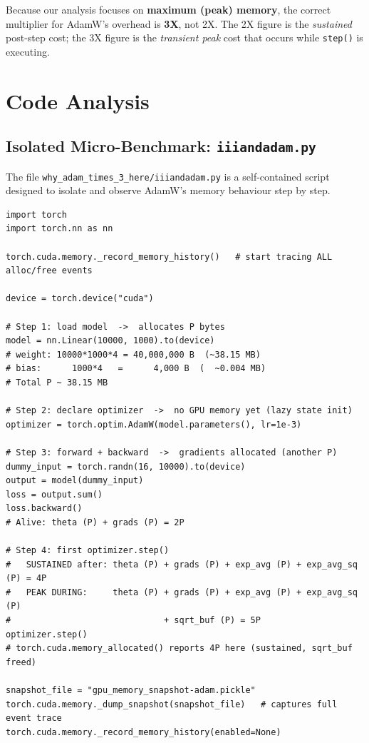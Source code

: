 \documentclass[11pt,a4paper]{article}
\begin{document}
\begin{insight}
Because our analysis focuses on \textbf{maximum (peak) memory}, the
correct multiplier for AdamW's overhead is \textbf{3X}, not 2X.  The
2X figure is the \emph{sustained} post-step cost; the 3X figure is the
\emph{transient peak} cost that occurs while \texttt{step()} is executing.
\end{insight}

\section{Code Analysis}
\label{sec:code}

\subsection{Isolated Micro-Benchmark: \texttt{iiiandadam.py}}
\label{sec:iiiandadam}

The file \texttt{why\_adam\_times\_3\_here/iiiandadam.py} is a self-contained
script designed to isolate and observe AdamW's memory behaviour step by
step.

\begin{lstlisting}[caption={\texttt{why\_adam\_times\_3\_here/iiiandadam.py} (full script).}]
import torch
import torch.nn as nn

torch.cuda.memory._record_memory_history()   # start tracing ALL alloc/free events

device = torch.device("cuda")

# Step 1: load model  ->  allocates P bytes
model = nn.Linear(10000, 1000).to(device)
# weight: 10000*1000*4 = 40,000,000 B  (~38.15 MB)
# bias:      1000*4   =      4,000 B  (  ~0.004 MB)
# Total P ~ 38.15 MB

# Step 2: declare optimizer  ->  no GPU memory yet (lazy state init)
optimizer = torch.optim.AdamW(model.parameters(), lr=1e-3)

# Step 3: forward + backward  ->  gradients allocated (another P)
dummy_input = torch.randn(16, 10000).to(device)
output = model(dummy_input)
loss = output.sum()
loss.backward()
# Alive: theta (P) + grads (P) = 2P

# Step 4: first optimizer.step()
#   SUSTAINED after: theta (P) + grads (P) + exp_avg (P) + exp_avg_sq (P) = 4P
#   PEAK DURING:     theta (P) + grads (P) + exp_avg (P) + exp_avg_sq (P)
#                              + sqrt_buf (P) = 5P
optimizer.step()
# torch.cuda.memory_allocated() reports 4P here (sustained, sqrt_buf freed)

snapshot_file = "gpu_memory_snapshot-adam.pickle"
torch.cuda.memory._dump_snapshot(snapshot_file)   # captures full event trace
torch.cuda.memory._record_memory_history(enabled=None)
\end{lstlisting}
\end{document}
